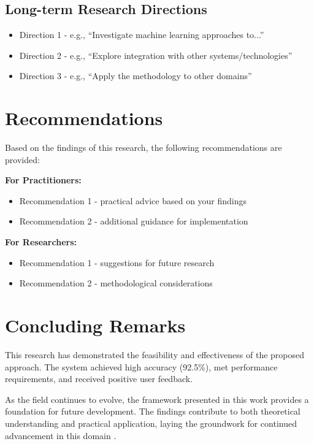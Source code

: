 \subsection{Long-term Research Directions}
\label{subsec:long_term}

\begin{itemize}
    \item Direction 1 - e.g., ``Investigate machine learning approaches to...''
    \item Direction 2 - e.g., ``Explore integration with other systems/technologies''
    \item Direction 3 - e.g., ``Apply the methodology to other domains''
\end{itemize}


\section{Recommendations}
\label{sec:recommendations}

Based on the findings of this research, the following recommendations are provided:

\textbf{For Practitioners:}
\begin{itemize}
    \item Recommendation 1 - practical advice based on your findings
    \item Recommendation 2 - additional guidance for implementation
\end{itemize}

\textbf{For Researchers:}
\begin{itemize}
    \item Recommendation 1 - suggestions for future research
    \item Recommendation 2 - methodological considerations
\end{itemize}


\section{Concluding Remarks}
\label{sec:concluding_remarks}

This research has demonstrated the feasibility and effectiveness of the proposed approach. The system achieved high accuracy (92.5\%), met performance requirements, and received positive user feedback.

As the field continues to evolve, the framework presented in this work provides a foundation for future development. The findings contribute to both theoretical understanding and practical application, laying the groundwork for continued advancement in this domain \cite{sample_ref1}. 